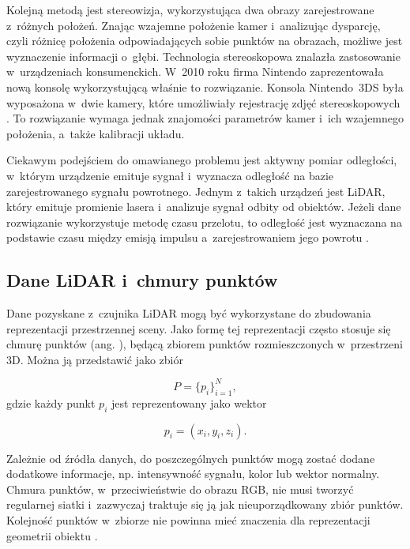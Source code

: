 Kolejną metodą jest stereowizja, wykorzystująca dwa obrazy zarejestrowane z~różnych położeń. Znając wzajemne położenie kamer i~analizując dysparcję, czyli różnicę położenia odpowiadających sobie punktów na obrazach, możliwe jest wyznaczenie informacji o~głębi. Technologia stereoskopowa znalazła zastosowanie w~urządzeniach konsumenckich. W~2010 roku firma Nintendo zaprezentowała nową konsolę wykorzystującą właśnie to rozwiązanie. Konsola Nintendo~3DS była wyposażona w~dwie kamery, które umożliwiały rejestrację zdjęć stereoskopowych \cite{bib:Ito2012Stereoscopic}. To rozwiązanie wymaga jednak znajomości parametrów kamer i~ich wzajemnego położenia, a~także kalibracji układu.

Ciekawym podejściem do omawianego problemu jest aktywny pomiar odległości, w~którym urządzenie emituje sygnał i~wyznacza odległość na bazie zarejestrowanego sygnału powrotnego. Jednym z~takich urządzeń jest LiDAR, który emituje promienie lasera i~analizuje sygnał odbity od obiektów. Jeżeli dane rozwiązanie wykorzystuje metodę czasu przelotu, to odległość jest wyznaczana na podstawie czasu między emisją impulsu a~zarejestrowaniem jego powrotu \cite{bib:royo2019lidar}.

\subsection{Dane LiDAR i~chmury punktów}

Dane pozyskane z~czujnika LiDAR mogą być wykorzystane do zbudowania reprezentacji przestrzennej sceny. Jako formę tej reprezentacji często stosuje się chmurę punktów (ang. ), będącą zbiorem punktów rozmieszczonych w~przestrzeni 3D. Można ją przedstawić jako zbiór

\begin{equation}
    P = \{p_i\}_{i=1}^{N},
\end{equation}
gdzie każdy punkt $p_i$ jest reprezentowany jako wektor

\begin{equation}
    p_i = (x_i, y_i, z_i).
\end{equation}

Zależnie od źródła danych, do poszczególnych punktów mogą zostać dodane dodatkowe informacje, np. intensywność sygnału, kolor lub wektor normalny. Chmura punktów, w~przeciwieństwie do obrazu RGB, nie musi tworzyć regularnej siatki i~zazwyczaj traktuje się ją jak nieuporządkowany zbiór punktów. Kolejność punktów w~zbiorze nie powinna mieć znaczenia dla reprezentacji geometrii obiektu \cite{bib:qi2017pointnet}.

